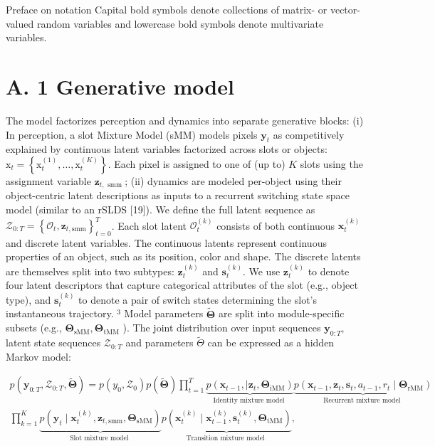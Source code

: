 \documentclass[10pt]{article}
\begin{document}
Preface on notation Capital bold symbols denote collections of matrix- or vector-valued random variables and lowercase bold symbols denote multivariate variables.

\section*{A. 1 Generative model}
The model factorizes perception and dynamics into separate generative blocks: (i) In perception, a slot Mixture Model (sMM) models pixels $\mathbf{y}_{t}$ as competitively explained by continuous latent variables factorized across slots or objects: $\mathrm{x}_{t}=\left\{\mathrm{x}_{t}^{(1)}, \ldots, \mathrm{x}_{t}^{(K)}\right\}$. Each pixel is assigned to one of (up to) $K$ slots using the assignment variable $\mathbf{z}_{t, \text { smm }}$; (ii) dynamics are modeled per-object using their object-centric latent descriptions as inputs to a recurrent switching state space model (similar to an rSLDS [19]). We define the full latent sequence as $\mathcal{Z}_{0: T}=\left\{\mathcal{O}_{t}, \mathbf{z}_{t, \mathrm{smm}}\right\}_{t=0}^{T}$. Each slot latent $\mathcal{O}_{t}^{(k)}$ consists of both continuous $\mathbf{x}_{t}^{(k)}$ and discrete latent variables. The continuous latents represent continuous properties of an object, such as its position, color and shape. The discrete latents are themselves split into two subtypes: $\mathbf{z}_{t}^{(k)}$ and $\mathbf{s}_{t}^{(k)}$. We use $\mathbf{z}_{t}^{(k)}$ to denote four latent descriptors that capture categorical attributes of the slot (e.g., object type), and $\mathbf{s}_{t}^{(k)}$ to denote a pair of switch states determining the slot's instantaneous trajectory. ${ }^{3}$ Model parameters $\tilde{\boldsymbol{\Theta}}$ are split into module-specific subsets (e.g., $\boldsymbol{\Theta}_{\mathrm{sMM}}, \boldsymbol{\Theta}_{\mathrm{tMM}}$ ). The joint distribution over input sequences $\mathbf{y}_{0: T}$, latent state sequences $\mathcal{Z}_{0: T}$ and parameters $\tilde{\Theta}$ can be expressed as a hidden Markov model:

\[
\begin{array}{r}
p\left(\mathbf{y}_{0: T}, \mathcal{Z}_{0: T}, \tilde{\boldsymbol{\Theta}}\right)=p\left(y_{0}, \mathcal{Z}_{0}\right) p(\tilde{\boldsymbol{\Theta}}) \prod_{t=1}^{T} \underbrace{p\left(\mathbf{x}_{t-1}, \mid \mathbf{z}_{t}, \boldsymbol{\Theta}_{\mathrm{iMM}}\right)}_{\text {Identity mixture model }} \underbrace{p\left(\mathbf{x}_{t-1}, \mathbf{z}_{t}, \mathbf{s}_{t}, a_{t-1}, r_{t} \mid \boldsymbol{\Theta}_{\mathrm{rMM}}\right)}_{\text {Recurrent mixture model }} \\
\prod_{k=1}^{K} \underbrace{p\left(\mathbf{y}_{t} \mid \mathbf{x}_{t}^{(k)}, \mathbf{z}_{t, \mathrm{smm}}, \boldsymbol{\Theta}_{\mathrm{sMM}}\right)}_{\text {Slot mixture model }} \underbrace{p\left(\mathbf{x}_{t}^{(k)} \mid \mathbf{x}_{t-1}^{(k)}, \mathbf{s}_{t}^{(k)}, \boldsymbol{\Theta}_{\mathrm{tMM}}\right)}_{\text {Transition mixture model }}, \tag{11}
\end{array}
\]
\end{document}
